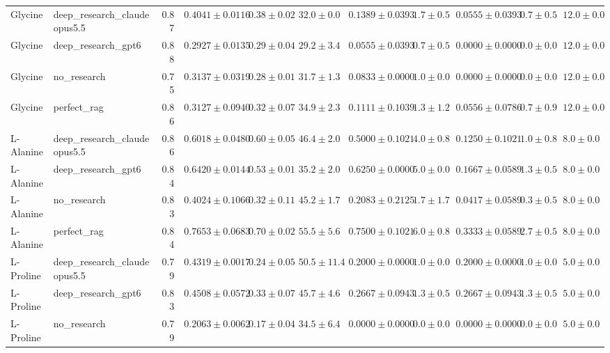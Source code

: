 \begin{table}[htbp]
\begin{tabular}{llrrrrrrrrr}
\midrule
Glycine & deep_research_claudeopus5.5 & 0.87 & \cellcolor{green!25}$0.4041 \pm 0.0116$ & $0.38 \pm 0.02$ & $32.0 \pm 0.0$ & $0.1389 \pm 0.0393$ & $1.7 \pm 0.5$ & $0.0555 \pm 0.0393$ & $0.7 \pm 0.5$ & $12.0 \pm 0.0$ \\
Glycine & deep_research_gpt6 & 0.88 & \cellcolor{red!25}$0.2927 \pm 0.0135$ & $0.29 \pm 0.04$ & $29.2 \pm 3.4$ & $0.0555 \pm 0.0393$ & $0.7 \pm 0.5$ & $0.0000 \pm 0.0000$ & $0.0 \pm 0.0$ & $12.0 \pm 0.0$ \\
Glycine & no_research & 0.75 & $0.3137 \pm 0.0319$ & $0.28 \pm 0.01$ & $31.7 \pm 1.3$ & $0.0833 \pm 0.0000$ & $1.0 \pm 0.0$ & $0.0000 \pm 0.0000$ & $0.0 \pm 0.0$ & $12.0 \pm 0.0$ \\
Glycine & perfect_rag & 0.86 & $0.3127 \pm 0.0940$ & $0.32 \pm 0.07$ & $34.9 \pm 2.3$ & $0.1111 \pm 0.1039$ & $1.3 \pm 1.2$ & $0.0556 \pm 0.0786$ & $0.7 \pm 0.9$ & $12.0 \pm 0.0$ \\
\midrule
L-Alanine & deep_research_claudeopus5.5 & 0.86 & $0.6018 \pm 0.0480$ & $0.60 \pm 0.05$ & $46.4 \pm 2.0$ & $0.5000 \pm 0.1021$ & $4.0 \pm 0.8$ & $0.1250 \pm 0.1021$ & $1.0 \pm 0.8$ & $8.0 \pm 0.0$ \\
L-Alanine & deep_research_gpt6 & 0.84 & $0.6420 \pm 0.0144$ & $0.53 \pm 0.01$ & $35.2 \pm 2.0$ & $0.6250 \pm 0.0000$ & $5.0 \pm 0.0$ & $0.1667 \pm 0.0589$ & $1.3 \pm 0.5$ & $8.0 \pm 0.0$ \\
L-Alanine & no_research & 0.83 & \cellcolor{red!25}$0.4024 \pm 0.1066$ & $0.32 \pm 0.11$ & $45.2 \pm 1.7$ & $0.2083 \pm 0.2125$ & $1.7 \pm 1.7$ & $0.0417 \pm 0.0589$ & $0.3 \pm 0.5$ & $8.0 \pm 0.0$ \\
L-Alanine & perfect_rag & 0.84 & \cellcolor{green!25}$0.7653 \pm 0.0683$ & $0.70 \pm 0.02$ & $55.5 \pm 5.6$ & $0.7500 \pm 0.1021$ & $6.0 \pm 0.8$ & $0.3333 \pm 0.0589$ & $2.7 \pm 0.5$ & $8.0 \pm 0.0$ \\
\midrule
L-Proline & deep_research_claudeopus5.5 & 0.79 & $0.4319 \pm 0.0017$ & $0.24 \pm 0.05$ & $50.5 \pm 11.4$ & $0.2000 \pm 0.0000$ & $1.0 \pm 0.0$ & $0.2000 \pm 0.0000$ & $1.0 \pm 0.0$ & $5.0 \pm 0.0$ \\
L-Proline & deep_research_gpt6 & 0.83 & \cellcolor{green!25}$0.4508 \pm 0.0572$ & $0.33 \pm 0.07$ & $45.7 \pm 4.6$ & $0.2667 \pm 0.0943$ & $1.3 \pm 0.5$ & $0.2667 \pm 0.0943$ & $1.3 \pm 0.5$ & $5.0 \pm 0.0$ \\
L-Proline & no_research & 0.79 & \cellcolor{red!25}$0.2063 \pm 0.0062$ & $0.17 \pm 0.04$ & $34.5 \pm 6.4$ & $0.0000 \pm 0.0000$ & $0.0 \pm 0.0$ & $0.0000 \pm 0.0000$ & $0.0 \pm 0.0$ & $5.0 \pm 0.0$ \\

\end{tabular}
\end{table}
